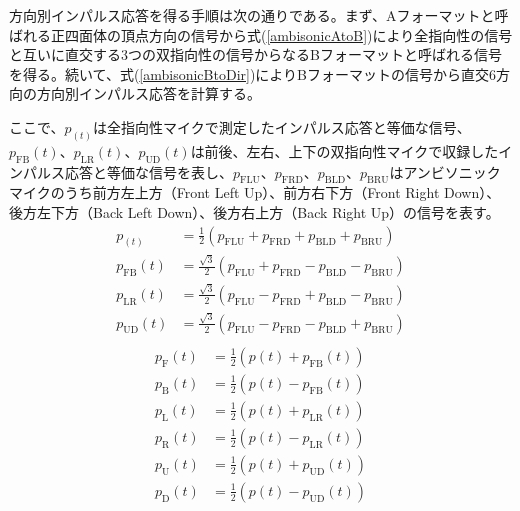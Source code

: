 \documentclass[11pt,a4j]{jreport}
\begin{document}
方向別インパルス応答を得る手順は次の通りである。まず、Aフォーマットと呼ばれる正四面体の頂点方向の信号から式(\ref{ambisonicAtoB})により全指向性の信号と互いに直交する3つの双指向性の信号からなるBフォーマットと呼ばれる信号を得る。続いて、式(\ref{ambisonicBtoDir})によりBフォーマットの信号から直交6方向の方向別インパルス応答を計算する。

ここで、$p_(t)$は全指向性マイクで測定したインパルス応答と等価な信号、$p_{\mathrm{FB}}(t)$、$p_{\mathrm{LR}}(t)$、$p_{\mathrm{UD}}(t)$は前後、左右、上下の双指向性マイクで収録したインパルス応答と等価な信号を表し、$p_{\mathrm{FLU}}$、$p_{\mathrm{FRD}}$、$p_{\mathrm{BLD}}$、$p_{\mathrm{BRU}}$はアンビソニックマイクのうち前方左上方（Front Left Up）、前方右下方（Front Right Down）、後方左下方（Back Left Down）、後方右上方（Back Right Up）の信号を表す。
\begin{equation}
  \label{ambisonicAtoB}
  \begin{alignedat}{4}
    p_(t) &= \frac{1}{2} (p_{\mathrm{FLU}} + p_{\mathrm{FRD}} + p_{\mathrm{BLD}} + p_{\mathrm{BRU}})
    \\
    p_{\mathrm{FB}}(t) &= \frac{\sqrt{3}}{2} (p_{\mathrm{FLU}} + p_{\mathrm{FRD}} - p_{\mathrm{BLD}} - p_{\mathrm{BRU}})
    \\
    p_{\mathrm{LR}}(t) &= \frac{\sqrt{3}}{2} (p_{\mathrm{FLU}} - p_{\mathrm{FRD}} + p_{\mathrm{BLD}} - p_{\mathrm{BRU}})
    \\
    p_{\mathrm{UD}}(t) &= \frac{\sqrt{3}}{2} (p_{\mathrm{FLU}} - p_{\mathrm{FRD}} - p_{\mathrm{BLD}} + p_{\mathrm{BRU}})
    \\
  \end{alignedat}
\end{equation}
\begin{equation}
  \label{ambisonicBtoDir}
  \begin{alignedat}{6}
    p_{\mathrm{F}}(t) &= \frac{1}{2} (p(t) + p_{\mathrm{FB}}(t))
    \\
    p_{\mathrm{B}}(t) &= \frac{1}{2} (p(t) - p_{\mathrm{FB}}(t))
    \\
    p_{\mathrm{L}}(t) &= \frac{1}{2} (p(t) + p_{\mathrm{LR}}(t))
    \\
    p_{\mathrm{R}}(t) &= \frac{1}{2} (p(t) - p_{\mathrm{LR}}(t))
    \\
    p_{\mathrm{U}}(t) &= \frac{1}{2} (p(t) + p_{\mathrm{UD}}(t))
    \\
    p_{\mathrm{D}}(t) &= \frac{1}{2} (p(t) - p_{\mathrm{UD}}(t)) \\
  \end{alignedat}
\end{equation}
\end{document}
